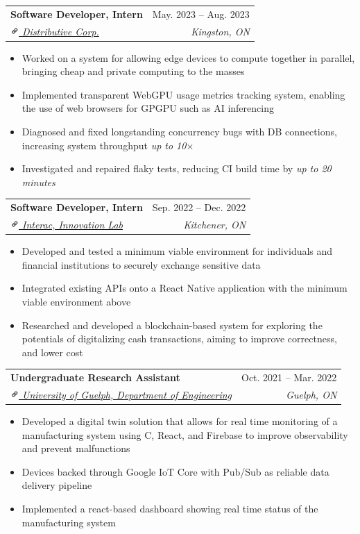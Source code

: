 \documentclass[letterpaper, 10pt]{report}
\makeatletter
\newcommand{\resumeSubheading}[4]{
    \begin{tabular*}{\textwidth}[t]{l@{\extracolsep{\fill}}r}
        \textbf{#1}       & #2                \\
        \textit{\small#3} & \textit{\small#4} \\
    \end{tabular*}\vspace{-0.7em}
}
\newenvironment{ResumeItem}{
    \vspace{-0.3em}
    \begin{itemize}
        \setlength\itemsep{-0.3em}
        }{
    \end{itemize}\vspace{-0.3em}}
\newcommand{\cxx}{C\nolinebreak\hspace{-.05em}\raisebox{0.03ex}{\bf +}\nolinebreak\hspace{-.05em}\raisebox{.03ex}{\bf +}}
\newcommand{\linkIcon}{\includegraphics[height=9pt, trim=0 5cm 0 -1.5cm]{./img/link-icon}}
\makeatother
\begin{document}
\resumeSubheading
{Software Developer, Intern}{May. 2023 -- Aug. 2023}
{\href{https://distributive.network/}{\linkIcon{} Distributive Corp.}}{Kingston, ON}
\begin{ResumeItem}
    \item{Worked on a system for allowing edge devices to compute together in parallel, bringing cheap and private computing to the masses}
    \item{Implemented transparent WebGPU usage metrics tracking system, enabling the use of web browsers for GPGPU such as AI inferencing}
    \item{Diagnosed and fixed longstanding concurrency bugs with DB connections, increasing system throughput \emph{up to 10\(\times\)}}
    \item{Investigated and repaired flaky tests, reducing CI build time by \emph{up to 20 minutes}}
\end{ResumeItem}

\resumeSubheading
{Software Developer, Intern}{Sep. 2022 -- Dec. 2022}
{\href{https://www.interac.ca/en/}{\linkIcon{} Interac, Innovation Lab}}{Kitchener, ON}
\begin{ResumeItem}
    \item{Developed and tested a minimum viable environment for individuals and financial institutions to securely exchange sensitive data}
    \item{Integrated existing APIs onto a React Native application with the minimum viable environment above}
    \item{Researched and developed a blockchain-based system for exploring the potentials of digitalizing cash transactions, aiming to improve correctness, and lower cost}
\end{ResumeItem}


\resumeSubheading
{Undergraduate Research Assistant} {Oct. 2021 -- Mar. 2022}
{\href{https://www.uoguelph.ca/engineering/}{\linkIcon{} University of Guelph, Department of Engineering}}{Guelph, ON}

\begin{ResumeItem}
    \item{Developed a digital twin solution that allows for real time monitoring of a manufacturing system using \cxx, React, and Firebase to improve observability and prevent malfunctions}
    \item{Devices backed through Google IoT Core with Pub/Sub as reliable data delivery pipeline}
    \item{Implemented a react-based dashboard showing real time status of the manufacturing system}
\end{ResumeItem}
\end{document}
